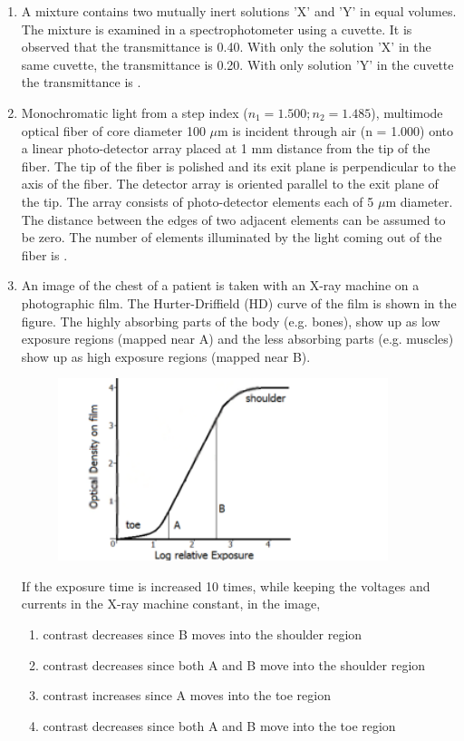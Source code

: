 \documentclass[journal,12pt,onecolumn]{IEEEtran}
\theoremstyle{remark}
\begin{document}
\begin{enumerate}
    \item A mixture contains two mutually inert solutions 'X' and 'Y' in equal volumes. The mixture is examined in a spectrophotometer using a cuvette. It is observed that the transmittance is 0.40. With only the solution 'X' in the same cuvette, the transmittance is 0.20. With only solution 'Y' in the cuvette the transmittance is \underline{\hspace{2cm}}.

    \vspace{0.5cm}
    
    \item Monochromatic light from a step index ($n_1 = 1.500; n_2 = 1.485$), multimode optical fiber of core diameter 100 $\mu$m is incident through air (n = 1.000) onto a linear photo-detector array placed at 1 mm distance from the tip of the fiber. The tip of the fiber is polished and its exit plane is perpendicular to the axis of the fiber. The detector array is oriented parallel to the exit plane of the tip. The array consists of photo-detector elements each of 5 $\mu$m diameter. The distance between the edges of two adjacent elements can be assumed to be zero. The number of elements illuminated by the light coming out of the fiber is \underline{\hspace{2cm}}.

    \vspace{0.5cm}
    
    \item An image of the chest of a patient is taken with an X-ray machine on a photographic film. The Hurter-Driffield (HD) curve of the film is shown in the figure. The highly absorbing parts of the body (e.g. bones), show up as low exposure regions (mapped near A) and the less absorbing parts (e.g. muscles) show up as high exposure regions (mapped near B).
    \begin{figure}[H]
        \centering
        \includegraphics[width=0.5\columnwidth]{q54}
        \caption*{}
        \label{fig:placeholder}
    \end{figure}
    If the exposure time is increased 10 times, while keeping the voltages and currents in the X-ray machine constant, in the image,
    \begin{enumerate}
        \item contrast decreases since B moves into the shoulder region
        \item contrast decreases since both A and B move into the shoulder region
        \item contrast increases since A moves into the toe region
        \item contrast decreases since both A and B move into the toe region
    \end{enumerate}


\end{enumerate}
\end{document}
